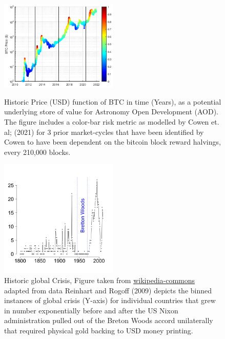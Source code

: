 \documentclass[final,5p,times,twocolumn,authoryear]{elsarticle}
\begin{document}
 \begin{figure}[h!]
  \centering
  \caption{Historic Price (USD) function of BTC in time (Years), as a potential underlying store of value for Astronomy Open Development (AOD). The figure includes a color-bar risk metric as modelled by Cowen et. al; (2021) for 3 prior market-cycles that have been identified by Cowen to have been dependent on the bitcoin block reward halvings, every 210,000 blocks.}
  \includegraphics[width=0.5\textwidth]{figs/cowen2.eps}
  \label{fig:cowen}
  \end{figure}

\begin{figure}[h!]
    \centering
    \label{fig:crisis}
  \caption{Historic global Crisis, Figure taken from \href{https://en.wikipedia.org/wiki/Global_recession}{wikipedia-commons} adapted from data Reinhart and Rogoff (2009) depicts the binned instances of global crisis (Y-axis) for individual countries that grew in number exponentially before and after the US Nixon administration pulled out of the Breton Woods accord unilaterally that required physical gold backing to USD money printing.}
  \includegraphics[width=0.5\textwidth]{figs/330px-BankingCrises.svg.png}
\end{figure}
\end{document}

